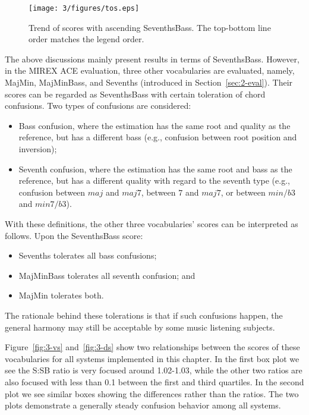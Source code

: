\begin{figure}[htb]
\centering
\texttt{[image: 3/figures/tos.eps]}
\caption{Trend of scores with ascending SeventhsBass. The top-bottom line order matches the legend order.}
\label{fig:3-tos}
\end{figure}

The above discussions mainly present results in terms of SeventhsBass. However, in the MIREX ACE evaluation, three other vocabularies are evaluated, namely, MajMin, MajMinBass, and Sevenths (introduced in Section~\ref{sec:2-eval}). Their scores can be regarded as SeventhsBass with certain toleration of chord confusions. Two types of confusions are considered:
\begin{itemize}
\item Bass confusion, where the estimation has the same root and quality as the reference, but has a different bass (e.g., confusion between root position and inversion);
\item Seventh confusion, where the estimation has the same root and bass as the reference, but has a different quality with regard to the seventh type (e.g., confusion between $maj$ and $maj7$, between $7$ and $maj7$, or between $min/b3$ and $min7/b3$).
\end{itemize}

With these definitions, the other three vocabularies' scores can be interpreted as follows. Upon the SeventhsBass score:
\begin{itemize}
\item Sevenths tolerates all bass confusions;
\item MajMinBass tolerates all seventh confusion; and
\item MajMin tolerates both.
\end{itemize}
The rationale behind these tolerations is that if such confusions happen, the general harmony may still be acceptable by some music listening subjects.

Figure~\ref{fig:3-vs} and~\ref{fig:3-ds} show two relationships between the scores of these vocabularies for all systems implemented in this chapter. In the first box plot we see the S:SB ratio is very focused around 1.02-1.03, while the other two ratios are also focused with less than 0.1 between the first and third quartiles. In the second plot we see similar boxes showing the differences rather than the ratios. The two plots demonstrate a generally steady confusion behavior among all systems.

